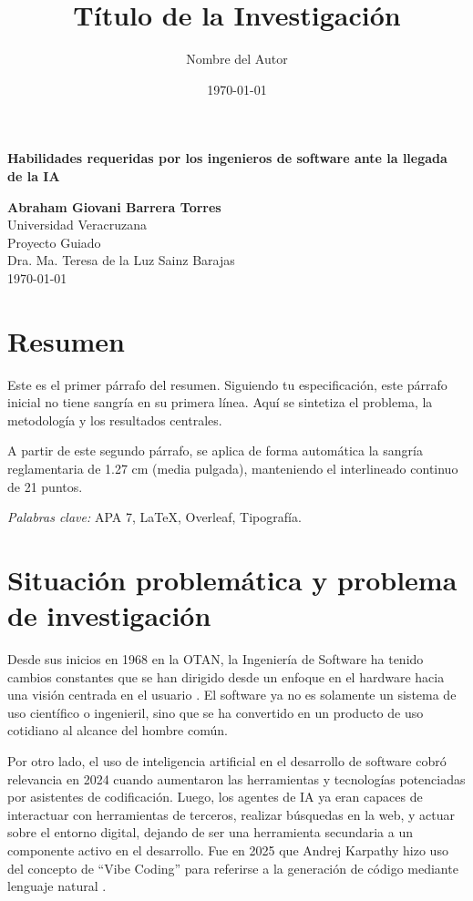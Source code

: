 \documentclass[12pt, letterpaper]{article}
\title{\textbf{Título de la Investigación}}
\author{Nombre del Autor}
\date{\today}
\begin{document}
\begin{titlepage}
    \centering
    \vspace*{2cm}
    {\fontsize{14pt}{24pt}\selectfont \textbf{Habilidades requeridas por los ingenieros de software ante la llegada de la IA}\par}
    \vspace{2.5cm}
    {\fontsize{12pt}{21pt}\selectfont
    \textbf{Abraham Giovani Barrera Torres}\\[0.5cm]
    Universidad Veracruzana\\[0.3cm]
    Proyecto Guiado\\[0.3cm]
    Dra. Ma. Teresa de la Luz Sainz Barajas\\[0.3cm]
    \today\par}
    \vfill
\end{titlepage}

\section*{Resumen}
Este es el primer párrafo del resumen. Siguiendo tu especificación, este párrafo inicial no tiene sangría en su primera línea. Aquí se sintetiza el problema, la metodología y los resultados centrales.

A partir de este segundo párrafo, se aplica de forma automática la sangría reglamentaria de 1.27 cm (media pulgada), manteniendo el interlineado continuo de 21 puntos.

\vspace{0.8cm}
\noindent \textit{Palabras clave:} APA 7, LaTeX, Overleaf, Tipografía.

\newpage

\section{Situación problemática y problema de investigación}

Desde sus inicios en 1968 en la OTAN, la Ingeniería de Software ha tenido cambios constantes que se han dirigido desde un enfoque en el hardware hacia una visión centrada en el usuario \parencite{11645215}. El software ya no es solamente un sistema de uso científico o ingenieril, sino que se ha convertido en un producto de uso cotidiano al alcance del hombre común.

Por otro lado, el uso de inteligencia artificial en el desarrollo de software cobró relevancia en 2024 cuando aumentaron las herramientas y tecnologías potenciadas por asistentes de codificación. Luego, los agentes de IA ya eran capaces de interactuar con herramientas de terceros, realizar búsquedas en la web, y actuar sobre el entorno digital, dejando de ser una herramienta secundaria a un componente activo en el desarrollo. Fue en 2025 que Andrej Karpathy hizo uso del concepto de “Vibe Coding” para referirse a la generación de código mediante lenguaje natural \parencite{11404330}.
\end{document}

